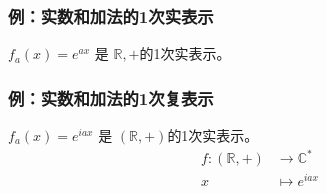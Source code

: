 \subsubsection{例：实数和加法的1次实表示}
$f_a(x)=e^{ax}$ 是 $\mathbb R, +$的1次实表示。

\subsubsection{例：实数和加法的1次复表示}
$f_a(x)=e^{iax}$ 是 $(\mathbb R, +)$的1次实表示。
\begin{equation}
\label{fubiaohsi}
\begin{split}
f:(\mathbb R, +) &\to \mathbb C^*\\
x  &\mapsto e^{iax}\\
\end{split}
\end{equation}
 


